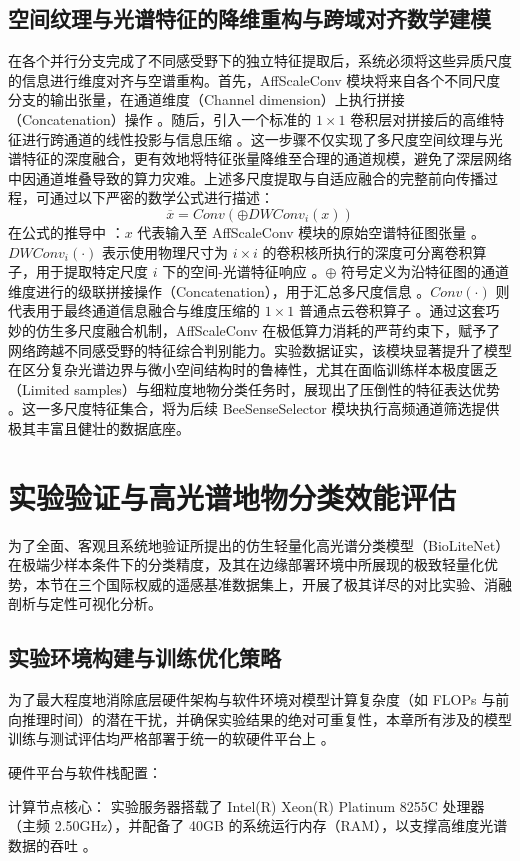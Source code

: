 \subsection{空间纹理与光谱特征的降维重构与跨域对齐数学建模}
在各个并行分支完成了不同感受野下的独立特征提取后，系统必须将这些异质尺度的信息进行维度对齐与空谱重构。首先，AffScaleConv 模块将来自各个不同尺度分支的输出张量，在通道维度（Channel dimension）上执行拼接（Concatenation）操作 。随后，引入一个标准的 $1 \times 1$ 卷积层对拼接后的高维特征进行跨通道的线性投影与信息压缩 。这一步骤不仅实现了多尺度空间纹理与光谱特征的深度融合，更有效地将特征张量降维至合理的通道规模，避免了深层网络中因通道堆叠导致的算力灾难。上述多尺度提取与自适应融合的完整前向传播过程，可通过以下严密的数学公式进行描述：$$\overline{x} = Conv(\oplus DWConv_{i}(x))$$在公式的推导中 ：$x$ 代表输入至 AffScaleConv 模块的原始空谱特征图张量 。$DWConv_{i}(\cdot)$ 表示使用物理尺寸为 $i \times i$ 的卷积核所执行的深度可分离卷积算子，用于提取特定尺度 $i$ 下的空间-光谱特征响应 。$\oplus$ 符号定义为沿特征图的通道维度进行的级联拼接操作（Concatenation），用于汇总多尺度信息 。$Conv(\cdot)$ 则代表用于最终通道信息融合与维度压缩的 $1 \times 1$ 普通点云卷积算子 。通过这套巧妙的仿生多尺度融合机制，AffScaleConv 在极低算力消耗的严苛约束下，赋予了网络跨越不同感受野的特征综合判别能力。实验数据证实，该模块显著提升了模型在区分复杂光谱边界与微小空间结构时的鲁棒性，尤其在面临训练样本极度匮乏（Limited samples）与细粒度地物分类任务时，展现出了压倒性的特征表达优势 。这一多尺度特征集合，将为后续 BeeSenseSelector 模块执行高频通道筛选提供极其丰富且健壮的数据底座。

\section{实验验证与高光谱地物分类效能评估}
为了全面、客观且系统地验证所提出的仿生轻量化高光谱分类模型（BioLiteNet）在极端少样本条件下的分类精度，及其在边缘部署环境中所展现的极致轻量化优势，本节在三个国际权威的遥感基准数据集上，开展了极其详尽的对比实验、消融剖析与定性可视化分析。

\subsection{实验环境构建与训练优化策略}
为了最大程度地消除底层硬件架构与软件环境对模型计算复杂度（如 FLOPs 与前向推理时间）的潜在干扰，并确保实验结果的绝对可重复性，本章所有涉及的模型训练与测试评估均严格部署于统一的软硬件平台上 。

硬件平台与软件栈配置：


计算节点核心： 实验服务器搭载了 Intel(R) Xeon(R) Platinum 8255C 处理器（主频 2.50GHz），并配备了 40GB 的系统运行内存（RAM），以支撑高维度光谱数据的吞吐 。


